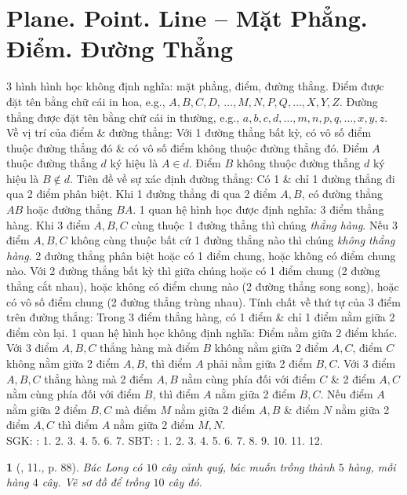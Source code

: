 \documentclass{article}
\newtheorem{baitoan}{}
\begin{document}
\section{Plane. Point. Line -- Mặt Phẳng. Điểm. Đường Thẳng}
 3 hình hình học không định nghĩa: mặt phẳng, điểm, đường thẳng. Điểm được đặt tên bằng chữ cái in hoa, e.g., $A,B,C,D$, $\ldots,M,N,P,Q,\ldots,X,Y,Z$. Đường thẳng được đặt tên bằng chữ cái in thường, e.g., $a,b,c,d,\ldots,m,n,p,q,\ldots,x,y,z$.  {\sf Về vị trí của điểm \& đường thẳng}: Với 1 đường thẳng bất kỳ, có vô số điểm thuộc đường thẳng đó \& có vô số điểm không thuộc đường thẳng đó. Điểm $A$ thuộc đường thẳng $d$ ký hiệu là $A\in d$. Điểm $B$ không thuộc đường thẳng $d$ ký hiệu là $B\notin d$.  {\sf Tiên đề về sự xác định đường thẳng}: Có 1 \& chỉ 1 đường thẳng đi qua 2 điểm phân biệt. Khi 1 đường thẳng đi qua 2 điểm $A,B$, có đường thẳng $AB$ hoặc đường thẳng $BA$. 1 quan hệ hình học được định nghĩa: 3 điểm thẳng hàng. Khi 3 điểm $A,B,C$ cùng thuộc 1 đường thẳng thì chúng \textit{thẳng hàng}. Nếu 3 điểm $A,B,C$ không cùng thuộc bất cứ 1 đường thẳng nào thì chúng \textit{không thẳng hàng}.  2 đường thẳng phân biệt hoặc có 1 điểm chung, hoặc không có điểm chung nào.  Với 2 đường thẳng bất kỳ thì giữa chúng hoặc có 1 điểm chung (2 đường thẳng cắt nhau), hoặc không có điểm chung nào (2 đường thẳng song song), hoặc có vô số điểm chung (2 đường thẳng trùng nhau).  {\sf Tính chất về thứ tự của 3 điểm trên đường thẳng}: Trong 3 điểm thẳng hàng, có 1 điểm \& chỉ 1 điểm nằm giữa 2 điểm còn lại.  1 quan hệ hình học không định nghĩa: Điểm nằm giữa 2 điểm khác.  Với 3 điểm $A,B,C$ thẳng hàng mà điểm $B$ không nằm giữa 2 điểm $A,C$, điểm $C$ không nằm giữa 2 điểm $A,B$, thì điểm $A$ phải nằm giữa 2 điểm $B,C$.  Với 3 điểm $A,B,C$ thẳng hàng mà 2 điểm $A,B$ nằm cùng phía đối với điểm $C$ \& 2 điểm $A,C$ nằm cùng phía đối với điểm $B$, thì điểm $A$ nằm giữa 2 điểm $B,C$.  Nếu điểm $A$ nằm giữa 2 điểm $B,C$ mà điểm $M$ nằm giữa 2 điểm $A,B$ \& điểm $N$ nằm giữa 2 điểm $A,C$ thì điểm $A$ nằm giữa 2 điểm $M,N$.\\

\noindent SGK: \cite[\S1, p. 79]{SGK_Toan_6_Canh_Dieu_tap_1}: 1. 2. 3. 4. 5. 6. 7. SBT: \cite{SBT_Toan_6_Canh_Dieu_tap_2}: 1. 2. 3. 4. 5. 6. 7. 8. 9. 10. 11. 12.

\begin{baitoan}[\cite{SBT_Toan_6_Canh_Dieu_tap_2}, 11., p. 88]
	Bác Long có $10$ cây cảnh quý, bác muốn trồng thành $5$ hàng, mỗi hàng $4$ cây. Vẽ sơ đồ để trồng $10$ cây đó.
\end{baitoan}
\end{document}

